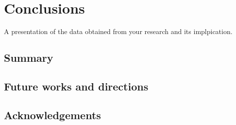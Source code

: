 
	\chapter{Conclusions}
	A presentation of the data obtained from your research and its implpication.
	\section{Summary}
	\section{Future works and directions}
	\section{Acknowledgements}
